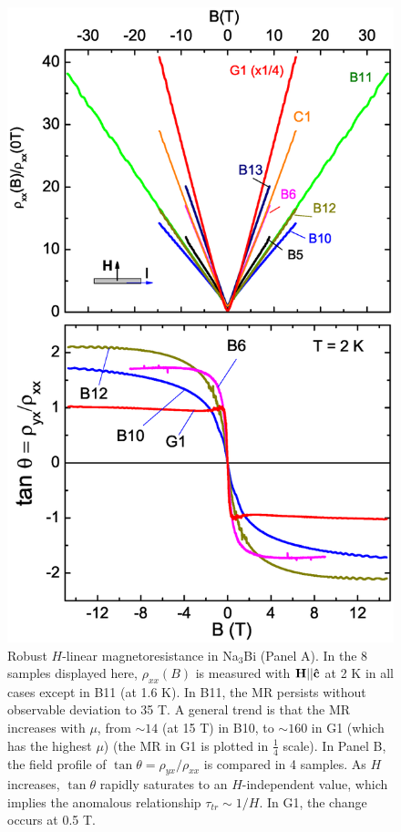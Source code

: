 \begin{figure}[!htbp]
  \begin{center}
\includegraphics[width=0.9\linewidth]{ch-na3bi/figures/FigMRHallAngle}
\caption{\label{figMRtan}
Robust $H$-linear magnetoresistance in Na$_3$Bi (Panel A). In the 8 samples displayed here, $\rho_{xx}(B)$ is measured with $\bf H||\hat{c}$ at 2 K in all cases except in B11 (at 1.6 K). In B11, the MR persists without observable deviation to 35 T. A general trend is that the MR increases with $\mu$, from $\sim 14$ (at 15 T) in B10, to $\sim 160$ in G1 (which has the highest $\mu$) (the MR in G1 is plotted in $\frac14$ scale). In Panel B, the field profile of $\tan\theta = \rho_{yx}/\rho_{xx}$ is compared in 4 samples. As $H$ increases, $\tan\theta$ rapidly saturates to an $H$-independent value, which implies the anomalous relationship $\tau_{tr}\sim 1/H$. In G1, the change occurs at 0.5 T.}
  \end{center}
\end{figure}


